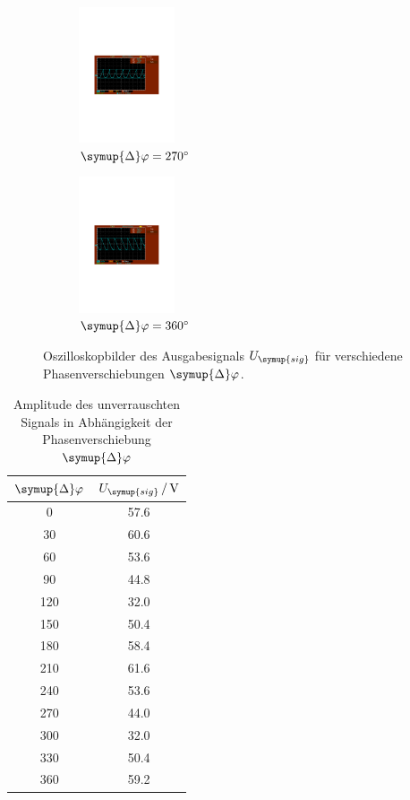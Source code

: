\begin{figure}
  \begin{subfigure}{0.48\textwidth}
    \centering
    \includegraphics[height=4cm]{content/Bilder/unverrauscht/270.pdf}
    \caption{$\symup{\Delta}\varphi = \qty{270}{\degree}$}
  \end{subfigure}
  \begin{subfigure}{0.48\textwidth}
    \centering
    \includegraphics[height=4cm]{content/Bilder/unverrauscht/360.pdf}
    \caption{$\symup{\Delta}\varphi = \qty{360}{\degree}$}
  \end{subfigure}
  \caption{Oszilloskopbilder des Ausgabesignals $U_{\symup{sig}}$ für verschiedene Phasenverschiebungen $\symup{\Delta}\varphi$.}
  \label{fig:<Bilder normal}
\end{figure}

\begin{table} [H]
  \centering
  \caption{Amplitude des unverrauschten Signals in Abhängigkeit der Phasenverschiebung $\symup{\Delta}\varphi$}
  \label{tab:unverrauscht}
  \begin{tabular}{S[table-format=3.0] S[table-format=2.1]}
    \toprule
    {$\symup{\Delta}\varphi$} & {$U_{\symup{sig}}\,/\,\unit{\volt}$} \\
    	  & 57.6 \\
    30	& 60.6 \\
    60	& 53.6 \\
    90	& 44.8 \\
    120	& 32.0 \\
    150	& 50.4 \\
    180	& 58.4 \\
    210	& 61.6 \\
    240	& 53.6 \\
    270	& 44.0 \\
    300	& 32.0 \\
    330	& 50.4 \\
    360	& 59.2 \\
    \bottomrule
  \end{tabular}
\end{table}

